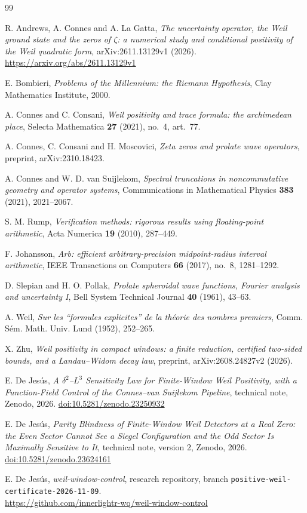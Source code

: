 \documentclass[11pt,a4paper]{article}
\theoremstyle{definition}
\theoremstyle{remark}
\begin{document}
\begin{thebibliography}{99}

 R. Andrews, A. Connes and A. La Gatta,
  \emph{The uncertainty operator, the Weil ground state and the zeros of
  $\zeta$: a numerical study and conditional positivity of the Weil quadratic
  form}, arXiv:2611.13129v1 (2026).
  \url{https://arxiv.org/abs/2611.13129v1}

 E. Bombieri,
\emph{Problems of the Millennium: the Riemann Hypothesis},
Clay Mathematics Institute, 2000.

 A. Connes and C. Consani,
\emph{Weil positivity and trace formula: the archimedean place},
Selecta Mathematica \textbf{27} (2021), no.~4, art.~77.

 A. Connes, C. Consani and H. Moscovici,
\emph{Zeta zeros and prolate wave operators},
preprint, arXiv:2310.18423.

 A. Connes and W. D. van Suijlekom,
\emph{Spectral truncations in noncommutative geometry and operator systems},
Communications in Mathematical Physics \textbf{383} (2021), 2021--2067.

 S. M. Rump,
\emph{Verification methods: rigorous results using floating-point arithmetic},
Acta Numerica \textbf{19} (2010), 287--449.

 F. Johansson,
\emph{Arb: efficient arbitrary-precision midpoint-radius interval arithmetic},
IEEE Transactions on Computers \textbf{66} (2017), no.~8, 1281--1292.

 D. Slepian and H. O. Pollak,
\emph{Prolate spheroidal wave functions, Fourier analysis and uncertainty I},
Bell System Technical Journal \textbf{40} (1961), 43--63.

 A. Weil,
\emph{Sur les ``formules explicites'' de la th\'eorie des nombres premiers},
Comm. S\'em. Math. Univ. Lund (1952), 252--265.

 X. Zhu,
\emph{Weil positivity in compact windows: a finite reduction, certified
two-sided bounds, and a Landau--Widom decay law},
preprint, arXiv:2608.24827v2 (2026).

 E. De Jes\'us,
\emph{A $\delta^2$--$L^3$ Sensitivity Law for Finite-Window Weil Positivity,
with a Function-Field Control of the Connes--van Suijlekom Pipeline},
technical note, Zenodo, 2026.
\href{https://doi.org/10.5281/zenodo.23250932}{doi:10.5281/zenodo.23250932}

 E. De Jes\'us,
\emph{Parity Blindness of Finite-Window Weil Detectors at a Real Zero:
the Even Sector Cannot See a Siegel Configuration and the Odd Sector Is
Maximally Sensitive to It},
technical note, version 2, Zenodo, 2026.
\href{https://doi.org/10.5281/zenodo.23624161}{doi:10.5281/zenodo.23624161}

 E. De Jes\'us,
\emph{weil-window-control}, research repository, branch
\texttt{positive-weil-certificate-2026-11-09}.\\
\url{https://github.com/innerlightr-wq/weil-window-control}

\end{thebibliography}
\end{document}
